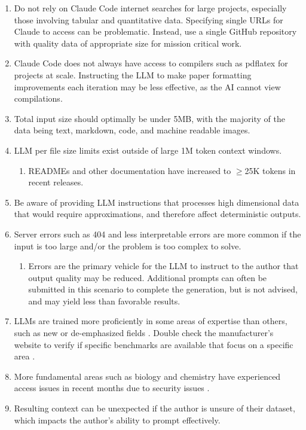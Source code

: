 \documentclass{article}
\begin{document}
\begin{enumerate}
\item Do not rely on Claude Code internet searches for large projects, especially those involving tabular and quantitative data. Specifying single URLs for Claude to access can be problematic. Instead, use a single GitHub repository with quality data of appropriate size for mission critical work. 
\item Claude Code does not always have access to compilers such as pdflatex for projects at scale. Instructing the LLM to make paper formatting improvements each iteration may be less effective, as the AI cannot view compilations.
\item Total input size should optimally be under 5MB, with the majority of the data being text, markdown, code, and machine readable images. 
\item LLM per file size limits exist outside of large 1M token context windows. 
\begin{enumerate}
\item READMEs and other documentation have increased to $\geq$25K tokens in recent releases.
\end{enumerate}
\item Be aware of providing LLM instructions that processes high dimensional data that would require approximations, and therefore affect deterministic outputs.
\item Server errors such as 404 and less interpretable errors are more common if the input is too large and/or the problem is too complex to solve. 
\begin{enumerate}
    \item Errors are the primary vehicle for the LLM to instruct to the author that output quality may be reduced. Additional prompts can often be submitted in this scenario to complete the generation, but is not advised, and may yield less than favorable results. 
\end{enumerate}
\item LLMs are trained more proficiently in some areas of expertise than others, such as new or de-emphasized fields \cite{HowLLMsTrain}. Double check the manufacturer's website to verify if specific benchmarks are available that focus on a specific area \cite{Opus48}.
\item More fundamental areas such as biology and chemistry have experienced access issues in recent months due to security issues \cite{SiliconCanals}.
\item Resulting context can be unexpected if the author is unsure of their dataset, which impacts the author's ability to prompt effectively.
\end{enumerate}
\end{document}

